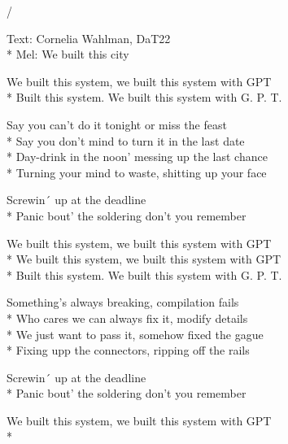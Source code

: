/\begin{SongText}
    \begin{SongInfo}
        Text: Cornelia Wahlman, DaT22\\*%
        Mel: We built this city
    \end{SongInfo}
    \begin{SongVerse}
        We built this system, we built this system with GPT\\*%
        Built this system. We built this system with G. P. T.
    \end{SongVerse}
     \begin{SongVerse}
        Say you can't do it tonight or miss the feast\\*%
        Say you don't mind to turn it in the last date\\*%
        Day-drink in the noon' messing up the last chance\\*%
        Turning your mind to waste, shitting up your face
    \end{SongVerse}   
    \begin{SongVerse}
        Screwin´ up at the deadline\\*%
        Panic bout' the soldering don't you remember 
    \end{SongVerse}
    \begin{SongVerse}
        We built this system, we built this system with GPT\\*%
        We built this system, we built this system with GPT\\*%
        Built this system. We built this system with G. P. T.
    \end{SongVerse}
    \begin{SongVerse}
        Something's always breaking, compilation fails\\*%
        Who cares we can always fix it, modify details\\*%
        We just want to pass it, somehow fixed the gague\\*%
        Fixing upp the connectors, ripping off the rails        
    \end{SongVerse}
    \begin{SongVerse}
        Screwin´ up at the deadline\\*%
        Panic bout' the soldering don't you remember 
    \end{SongVerse}
    \begin{SongVerse}
        We built this system, we built this system with GPT\\*%

\end{SongVerse}
\end{SongText}
